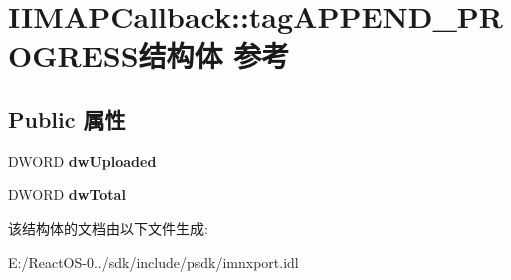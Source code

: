 \hypertarget{struct_i_i_m_a_p_callback_1_1tag_a_p_p_e_n_d___p_r_o_g_r_e_s_s}{}\section{I\+I\+M\+A\+P\+Callback\+:\+:tag\+A\+P\+P\+E\+N\+D\+\_\+\+P\+R\+O\+G\+R\+E\+S\+S结构体 参考}
\label{struct_i_i_m_a_p_callback_1_1tag_a_p_p_e_n_d___p_r_o_g_r_e_s_s}
\subsection*{Public 属性}
\begin{DoxyCompactItemize}
\item 
\mbox{\label{struct_i_i_m_a_p_callback_1_1tag_a_p_p_e_n_d___p_r_o_g_r_e_s_s_a078b10ffc76f0f65f6b8c9f72907ee90}} 
D\+W\+O\+RD {\bfseries dw\+Uploaded}
\item 
\mbox{\label{struct_i_i_m_a_p_callback_1_1tag_a_p_p_e_n_d___p_r_o_g_r_e_s_s_a4a544a60ce55486a54dd5cc35cb87db1}} 
D\+W\+O\+RD {\bfseries dw\+Total}
\end{DoxyCompactItemize}


该结构体的文档由以下文件生成\+:\begin{DoxyCompactItemize}
\item 
E\+:/\+React\+O\+S-\/0../sdk/include/psdk/imnxport.\+idl\end{DoxyCompactItemize}
